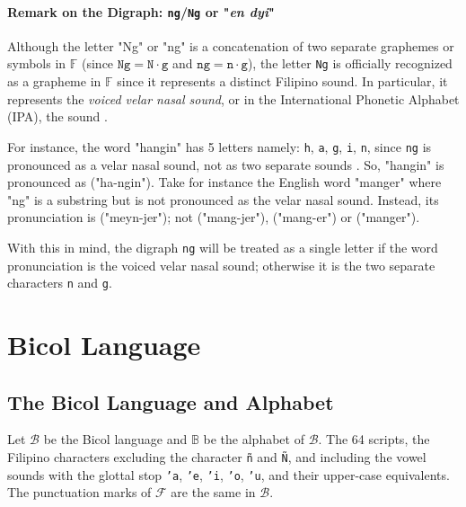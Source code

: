 \paragraph{Remark on the Digraph: \texttt{ng}/\texttt{Ng} or "\textit{en dyi}"}
\label{digraph_remark}

Although the letter "Ng" or "ng" is a concatenation of two separate graphemes or
symbols in \(\mathbb{F}\) (since \(\texttt{Ng} = \texttt{N}\cdot\texttt{g}\) and
\(\texttt{ng} = \texttt{n}\cdot\texttt{g}\)), the letter \texttt{Ng} is officially recognized
as a grapheme in \(\mathbb{F}\) since it represents a distinct Filipino sound.
In particular, it represents the \textit{voiced velar nasal sound}, or in the International
Phonetic Alphabet (IPA), the  sound \cite{Malabonga_2009}.

For instance, the word "hangin" has 5 letters namely: \texttt{h}, \texttt{a}, \texttt{g}, \texttt{i}, \texttt{n},
since \texttt{ng} is pronounced as a velar nasal sound, not as two separate sounds
. So, "hangin" is pronounced as  ("ha-ngin").
Take for instance the English  word "manger" where "ng" is a substring
but is not pronounced as the velar nasal sound. Instead, its pronunciation is
 ("meyn-jer"); not
 ("mang-jer"),
 ("mang-er") or
 ("manger").

With this in mind, the digraph \texttt{ng} will be treated as a single letter if the word pronunciation is the voiced velar nasal sound; otherwise it is the two separate characters \texttt{n} and \texttt{g}.

\section{Bicol Language}
\subsection{The Bicol Language and Alphabet}
Let $\mathcal{B}$ be the Bicol language and $\mathbb{B}$ be the alphabet of $\mathcal{B}$. The 64 scripts, the Filipino characters excluding the character \texttt{ñ} and \texttt{Ñ}, and including the vowel sounds with the glottal stop \texttt{'a}, \texttt{'e}, \texttt{'i}, \texttt{'o},  \texttt{'u}, and their upper-case equivalents. The punctuation marks of $\mathcal{F}$ are the same in $\mathcal{B}$.

